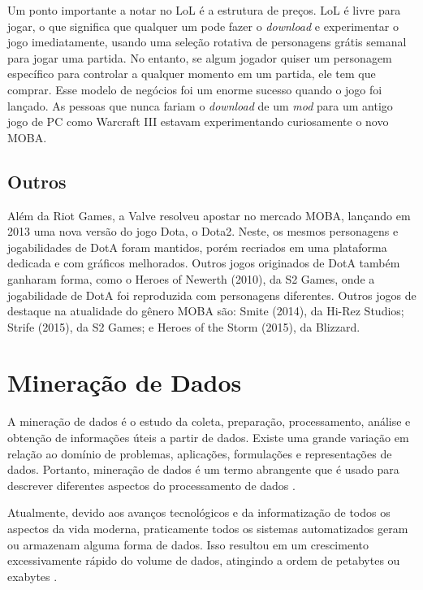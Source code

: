 Um ponto importante a notar no LoL é a estrutura de preços. LoL é livre para jogar, o que significa que qualquer um pode fazer o \textit{download} e experimentar o jogo imediatamente, usando uma seleção rotativa de personagens grátis semanal para jogar uma partida. No entanto, se algum jogador quiser um personagem específico para controlar a qualquer momento em um partida, ele tem que comprar. Esse modelo de negócios foi um enorme sucesso quando o jogo foi lançado. As pessoas que nunca fariam o \textit{download} de um \textit{mod} para um antigo jogo de PC como Warcraft III estavam experimentando curiosamente o novo MOBA.

\subsection{Outros}
Além da Riot Games, a Valve resolveu apostar no mercado MOBA, lançando em 2013 uma nova versão do jogo Dota, o Dota2. Neste, os mesmos personagens e jogabilidades de DotA foram mantidos, porém recriados em uma plataforma dedicada e com gráficos melhorados. Outros jogos originados de DotA também ganharam forma, como o Heroes of Newerth (2010), da S2 Games, onde a jogabilidade de DotA foi reproduzida com personagens diferentes. Outros jogos de destaque na atualidade do gênero MOBA são: Smite (2014), da Hi-Rez Studios; Strife (2015), da S2 Games; e Heroes of the Storm (2015), da Blizzard.

\section{Mineração de Dados}
A mineração de dados é o estudo da coleta, preparação, processamento, análise e obtenção de informações úteis a partir de dados. Existe uma grande variação em relação ao domínio de problemas, aplicações, formulações e representações de dados. Portanto, mineração de dados é um termo abrangente que é usado para descrever diferentes aspectos do processamento de dados \cite{aggarwal2015data}.

Atualmente, devido aos avanços tecnológicos e da informatização de todos os aspectos da vida moderna, praticamente todos os sistemas automatizados geram ou armazenam alguma forma de dados. Isso resultou em um crescimento excessivamente rápido do volume de dados, atingindo a ordem de petabytes ou exabytes \cite{aggarwal2015data}.

